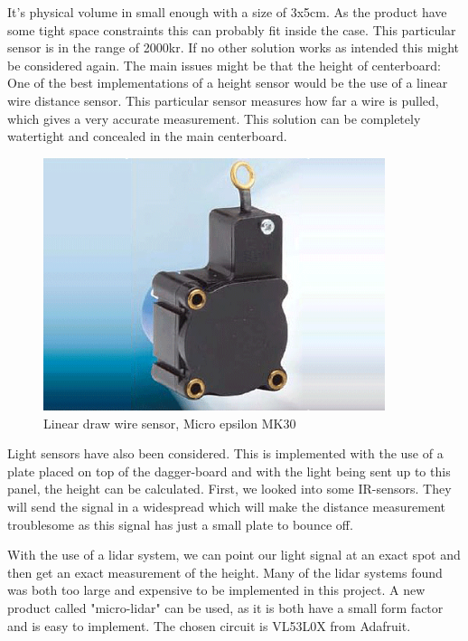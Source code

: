 It's physical volume in small enough with a size of 3x5cm. As the product have some tight space constraints this can probably fit inside the case. This particular sensor is in the range of 2000kr. If no other solution works as intended this might be considered again.
The main issues might be that the height of centerboard: %
One of the best implementations of a height sensor would be the use of a linear wire distance sensor. This particular sensor measures how far a wire is pulled, which gives a very accurate measurement. This solution can be completely watertight and concealed in the main centerboard.  

\begin{figure}[H]%
\begin{center}
	\includegraphics[width = 10cm]{Figures/microepsilon_mk30.png}
	\caption{Linear draw wire sensor, Micro epsilon MK30}
	\label{Draw_sensor}
\end{center}
\end{figure}

Light sensors have also been considered. This is implemented with the use of a plate placed on top of the dagger-board and with the light being sent up to this panel, the height can be calculated. First, we looked into some \gls{IR}-sensors. They will send the signal in a widespread which will make the distance measurement troublesome as this signal has just a small plate to bounce off.

With the use of a \gls{lidar} system, we can point our light signal at an exact spot and then get an exact measurement of the height.  
Many of the \gls{lidar} systems found was both too large and expensive to be implemented in this project.
A new product called "micro-lidar" can be used, as it is both have a small form factor and is easy to implement.
The chosen circuit is VL53L0X from Adafruit\cite{micro_lidar}. 

